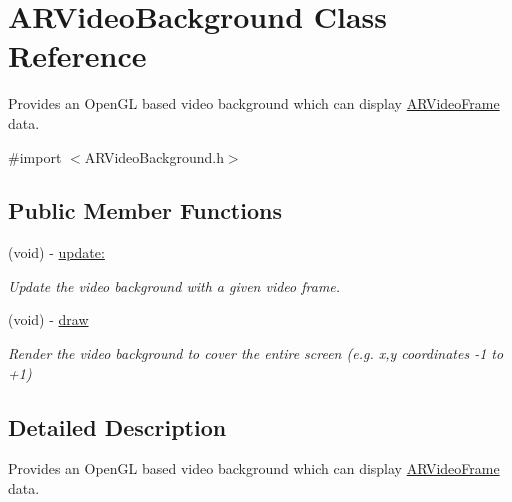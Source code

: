 \hypertarget{interface_a_r_video_background}{
\section{\-A\-R\-Video\-Background \-Class \-Reference}
\label{interface_a_r_video_background}
}


\-Provides an \-Open\-G\-L based video background which can display \hyperlink{struct_a_r_video_frame}{\-A\-R\-Video\-Frame} data.  




{\ttfamily \#import $<$\-A\-R\-Video\-Background.\-h$>$}

\subsection*{\-Public \-Member \-Functions}
\begin{DoxyCompactItemize}
\item 
(void) -\/ \hyperlink{interface_a_r_video_background_a912dbfd42208bacb82411d537e80c8b9}{update\-:}
\begin{DoxyCompactList}\small\item\em \-Update the video background with a given video frame. \end{DoxyCompactList}\item 
\hypertarget{interface_a_r_video_background_a792429cb57d31b0dc84de1fac63e486c}{
(void) -\/ \hyperlink{interface_a_r_video_background_a792429cb57d31b0dc84de1fac63e486c}{draw}}
\label{interface_a_r_video_background_a792429cb57d31b0dc84de1fac63e486c}

\begin{DoxyCompactList}\small\item\em \-Render the video background to cover the entire screen (e.\-g. x,y coordinates -\/1 to +1) \end{DoxyCompactList}\end{DoxyCompactItemize}


\subsection{\-Detailed \-Description}
\-Provides an \-Open\-G\-L based video background which can display \hyperlink{struct_a_r_video_frame}{\-A\-R\-Video\-Frame} data. 

